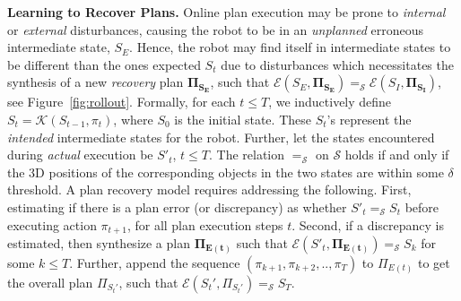 \textbf{Learning to Recover Plans. }
%
Online plan execution may be prone to \emph{internal} or \emph{external} disturbances, causing the robot to be in an \emph{unplanned} erroneous intermediate state, $S_E$. Hence, the robot may find itself in intermediate states to be different than the ones expected $S_t$ due to disturbances which necessitates the synthesis of a new \emph{recovery} plan $\mathbf{\Pi_{S_E}}$, such that $\mathcal{E}(S_E, \mathbf{\Pi_{S_E}}) =_\mathcal{S} \mathcal{E}(S_I, \mathbf{\Pi_{S_I}})$, see Figure~\ref{fig:rollout}.
%
Formally, for each $t \leq T$, we inductively define $S_t = \mathcal{K}(S_{t - 1}, \pi_t)$, where $S_0$ is the initial state. These $S_t$'s represent the \emph{intended} intermediate states for the robot. Further, let the states encountered during \emph{actual} execution be $S'_t$, $t \leq T$. 
%
The relation $=_\mathcal{S}$ on $\mathcal{S}$ holds if and only if the 3D positions of the corresponding objects in the two states are within some $\delta$ threshold. 
%
A plan recovery model requires addressing the following. First, estimating if there is a plan error (or discrepancy) as whether $S'_t =_\mathcal{S} S_t$ before executing action $\pi_{t + 1}$, for all plan execution steps $t$. 
%
Second, if a discrepancy is estimated, then synthesize a plan $\mathbf{\Pi_{E(t)}}$ such that $\mathcal{E}(S'_t, \mathbf{\Pi_{E(t)}}) =_\mathcal{S} S_k$ for some $k \leq T$.
%
Further, append the sequence $(\pi_{k + 1}, \pi_{k + 2}, .., \pi_T)$ to $\Pi_{E(t)}$ to get the overall plan $\Pi_{S_t'}$, such that $\mathcal{E}(S_t', \Pi_{S_t'}) =_\mathcal{S} S_T$. 

